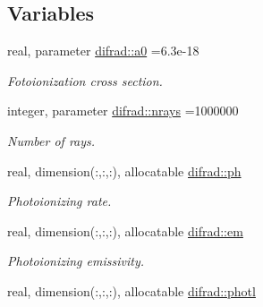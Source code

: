 \subsection*{Variables}
\begin{DoxyCompactItemize}
\item 
\hypertarget{namespacedifrad_a0062472e34b740c2c1cb5084d3284056}{}real, parameter \hyperlink{namespacedifrad_a0062472e34b740c2c1cb5084d3284056}{difrad\+::a0} =6.\+3e-\/18\label{namespacedifrad_a0062472e34b740c2c1cb5084d3284056}

\begin{DoxyCompactList}\small\item\em Fotoionization cross section. \end{DoxyCompactList}\item 
\hypertarget{namespacedifrad_aac6943b42d4dede95a3296bdc29c629a}{}integer, parameter \hyperlink{namespacedifrad_aac6943b42d4dede95a3296bdc29c629a}{difrad\+::nrays} =1000000\label{namespacedifrad_aac6943b42d4dede95a3296bdc29c629a}

\begin{DoxyCompactList}\small\item\em Number of rays. \end{DoxyCompactList}\item 
\hypertarget{namespacedifrad_ab532f1879434284f63aa97c79c305236}{}real, dimension(\+:,\+:,\+:), allocatable \hyperlink{namespacedifrad_ab532f1879434284f63aa97c79c305236}{difrad\+::ph}\label{namespacedifrad_ab532f1879434284f63aa97c79c305236}

\begin{DoxyCompactList}\small\item\em Photoionizing rate. \end{DoxyCompactList}\item 
\hypertarget{namespacedifrad_a7d908916fd1e050b9c5ba48771186d5b}{}real, dimension(\+:,\+:,\+:), allocatable \hyperlink{namespacedifrad_a7d908916fd1e050b9c5ba48771186d5b}{difrad\+::em}\label{namespacedifrad_a7d908916fd1e050b9c5ba48771186d5b}

\begin{DoxyCompactList}\small\item\em Photoionizing emissivity. \end{DoxyCompactList}\item 
\hypertarget{namespacedifrad_a3d6a043ec876c626f11238b6260a036a}{}real, dimension(\+:,\+:,\+:), allocatable \hyperlink{namespacedifrad_a3d6a043ec876c626f11238b6260a036a}{difrad\+::photl}\label{namespacedifrad_a3d6a043ec876c626f11238b6260a036a}


\end{DoxyCompactItemize}
